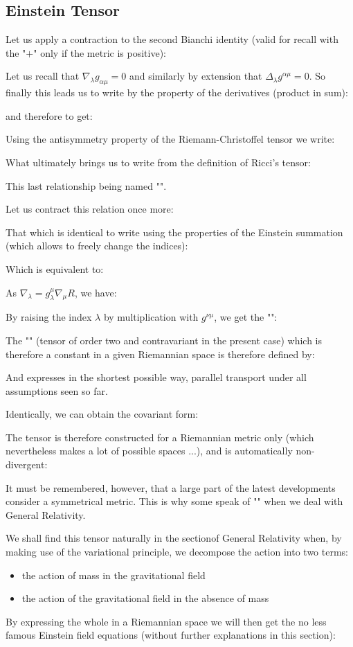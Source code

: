 	\subsection{Einstein Tensor}\label{einstein tensor}
	Let us apply a contraction to the second Bianchi  identity (valid for recall with the "$+$" only if the metric is positive):
	
	Let us recall that $\nabla_\lambda g_{\alpha\mu}=0$ and similarly by extension that $\Delta_\lambda g^{\alpha\mu}=0$. So finally this leads us to write by the property of the derivatives (product in sum):
	
	and therefore to get:
	
	 Using the antisymmetry property of the Riemann-Christoffel tensor we write:
	
	What ultimately brings us to write from the definition of Ricci's tensor:
	
	This last relationship being named "".

	Let us contract this relation once more:
	 
	That which is identical to write using the properties of the Einstein summation (which allows to freely change the indices):
	
	Which is equivalent to:
	
	As $\nabla_\lambda=g_{\lambda}^\mu \nabla_\mu R$, we have:
	
	By raising the index $\lambda$ by multiplication with $g^{\nu\mu}$, we get the "":
	
	The "" (tensor of order two and contravariant in the present case) which is therefore a constant in a given Riemannian space is therefore defined by:
	
	And expresses in the shortest possible way, parallel transport under all assumptions seen so far.

	Identically, we can obtain the covariant form:
	
	The tensor is therefore constructed for a Riemannian metric only (which nevertheless makes a lot of possible spaces ...), and is automatically non-divergent:
	
	It must be remembered, however, that a large part of the latest developments consider a symmetrical metric. This is why some speak of "" when we deal with General Relativity.

	We shall find this tensor naturally in the sectionof General Relativity when, by making use of the variational principle, we decompose the action into two terms:
	\begin{itemize}
		\item the action of mass in the gravitational field

		\item the action of the gravitational field in the absence of mass
	\end{itemize}
	By expressing the whole in a Riemannian space we will then get the no less famous Einstein field equations (without further explanations in this section):
	
